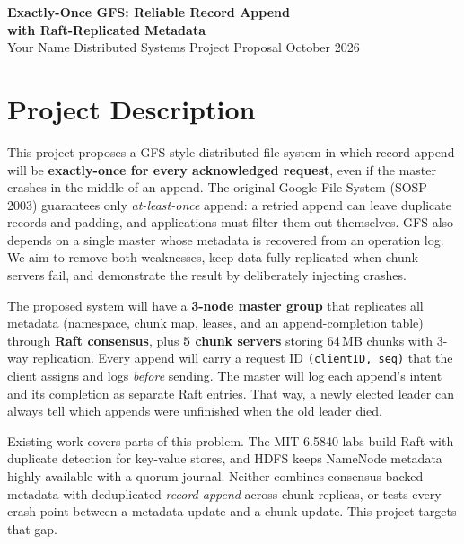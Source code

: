 \documentclass[10pt,a4paper]{article}
\begin{document}
\begin{center}
  {\LARGE\bfseries Exactly-Once GFS: Reliable Record Append\\[2pt] with Raft-Replicated Metadata}\\[6pt]
  {\normalsize Your Name \quad\textbullet\quad Distributed Systems Project Proposal \quad\textbullet{} October 2026}
\end{center}

\section{Project Description}

This project proposes a GFS-style distributed file system in which record append will be
\textbf{exactly-once for every acknowledged request}, even if the master crashes in the middle of an
append. The original Google File System (SOSP 2003) guarantees only \emph{at-least-once} append: a
retried append can leave duplicate records and padding, and applications must filter them out
themselves. GFS also depends on a single master whose metadata is recovered from an operation log. We
aim to remove both weaknesses, keep data fully replicated when chunk servers fail, and demonstrate the
result by deliberately injecting crashes.

The proposed system will have a \textbf{3-node master group} that replicates all metadata (namespace,
chunk map, leases, and an append-completion table) through \textbf{Raft consensus}, plus \textbf{5 chunk
servers} storing 64\,MB chunks with 3-way replication. Every append will carry a request ID
\texttt{(clientID, seq)} that the client assigns and logs \emph{before} sending. The master will log
each append's intent and its completion as separate Raft entries. That way, a newly elected leader can
always tell which appends were unfinished when the old leader died.

Existing work covers parts of this problem. The MIT 6.5840 labs build Raft with duplicate detection for
key-value stores, and HDFS keeps NameNode metadata highly available with a quorum journal. Neither
combines consensus-backed metadata with deduplicated \emph{record append} across chunk replicas, or
tests every crash point between a metadata update and a chunk update. This project targets that gap.
\end{document}
